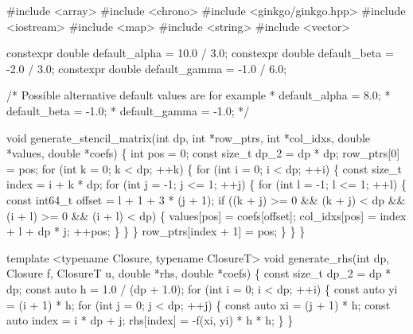 \begin{DoxyCodeInclude}
\textcolor{preprocessor}{#include <array>}
\textcolor{preprocessor}{#include <chrono>}
\textcolor{preprocessor}{#include <ginkgo/ginkgo.hpp>}
\textcolor{preprocessor}{#include <iostream>}
\textcolor{preprocessor}{#include <map>}
\textcolor{preprocessor}{#include <string>}
\textcolor{preprocessor}{#include <vector>}

constexpr \textcolor{keywordtype}{double} default\_alpha = 10.0 / 3.0;
constexpr \textcolor{keywordtype}{double} default\_beta = -2.0 / 3.0;
constexpr \textcolor{keywordtype}{double} default\_gamma = -1.0 / 6.0;

\textcolor{comment}{/* Possible alternative default values are for example}
\textcolor{comment}{ * default\_alpha = 8.0;}
\textcolor{comment}{ * default\_beta = -1.0;}
\textcolor{comment}{ * default\_gamma = -1.0;}
\textcolor{comment}{ */}

\textcolor{keywordtype}{void} generate\_stencil\_matrix(\textcolor{keywordtype}{int} dp, \textcolor{keywordtype}{int} *row\_ptrs, \textcolor{keywordtype}{int} *col\_idxs,
                             \textcolor{keywordtype}{double} *values, \textcolor{keywordtype}{double} *coefs)
\{
    \textcolor{keywordtype}{int} pos = 0;
    \textcolor{keyword}{const} \textcolor{keywordtype}{size\_t} dp\_2 = dp * dp;
    row\_ptrs[0] = pos;
    \textcolor{keywordflow}{for} (\textcolor{keywordtype}{int} k = 0; k < dp; ++k) \{
        \textcolor{keywordflow}{for} (\textcolor{keywordtype}{int} i = 0; i < dp; ++i) \{
            \textcolor{keyword}{const} \textcolor{keywordtype}{size\_t} index = i + k * dp;
            \textcolor{keywordflow}{for} (\textcolor{keywordtype}{int} j = -1; j <= 1; ++j) \{
                \textcolor{keywordflow}{for} (\textcolor{keywordtype}{int} l = -1; l <= 1; ++l) \{
                    \textcolor{keyword}{const} int64\_t offset = l + 1 + 3 * (j + 1);
                    \textcolor{keywordflow}{if} ((k + j) >= 0 && (k + j) < dp && (i + l) >= 0 &&
                        (i + l) < dp) \{
                        values[pos] = coefs[offset];
                        col\_idxs[pos] = index + l + dp * j;
                        ++pos;
                    \}
                \}
            \}
            row\_ptrs[index + 1] = pos;
        \}
    \}
\}


\textcolor{keyword}{template} <\textcolor{keyword}{typename} Closure, \textcolor{keyword}{typename} ClosureT>
\textcolor{keywordtype}{void} generate\_rhs(\textcolor{keywordtype}{int} dp, Closure f, ClosureT u, \textcolor{keywordtype}{double} *rhs, \textcolor{keywordtype}{double} *coefs)
\{
    \textcolor{keyword}{const} \textcolor{keywordtype}{size\_t} dp\_2 = dp * dp;
    \textcolor{keyword}{const} \textcolor{keyword}{auto} h = 1.0 / (dp + 1.0);
    \textcolor{keywordflow}{for} (\textcolor{keywordtype}{int} i = 0; i < dp; ++i) \{
        \textcolor{keyword}{const} \textcolor{keyword}{auto} yi = (i + 1) * h;
        \textcolor{keywordflow}{for} (\textcolor{keywordtype}{int} j = 0; j < dp; ++j) \{
            \textcolor{keyword}{const} \textcolor{keyword}{auto} xi = (j + 1) * h;
            \textcolor{keyword}{const} \textcolor{keyword}{auto} index = i * dp + j;
            rhs[index] = -f(xi, yi) * h * h;
        \}
    \}


\end{DoxyCodeInclude}
